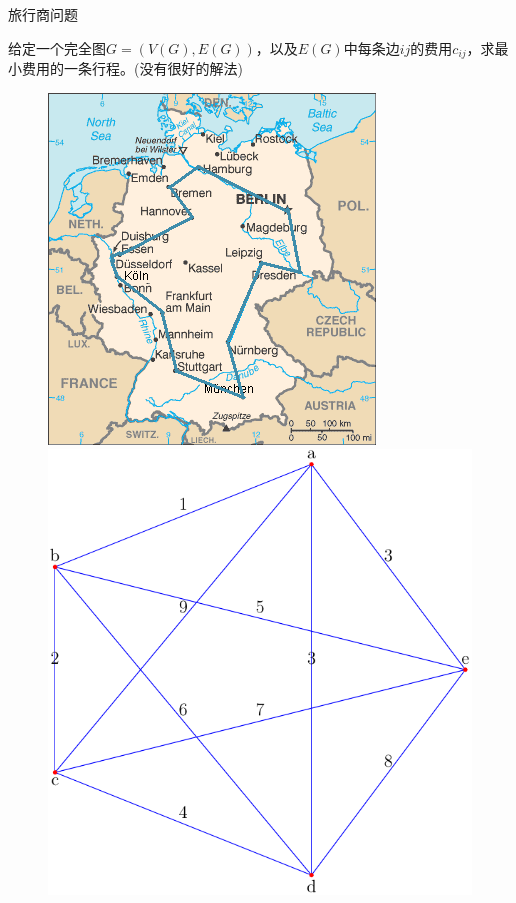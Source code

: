 \documentclass[UTF8]{ctexbeamer}
\begin{document}
\begin{frame}{旅行商问题}
  \begin{block}{}
    给定一个完全图$G=(V(G), E(G))$，以及$E(G)$中每条边$ij$的费用$c_{ij}$，求最小费用的一条行程。(没有很好的解法)
  \end{block}

  \begin{figure}
    \begin{minipage}{.5\linewidth}
      \includegraphics[width=.8\textwidth]{TSP_Deutschland_3.png}
    \end{minipage}%
    \begin{minipage}{.5\linewidth}
      \includegraphics[width=.8\textwidth]{salesman.pdf}
    \end{minipage}
  \end{figure}

\end{frame}
\end{document}

